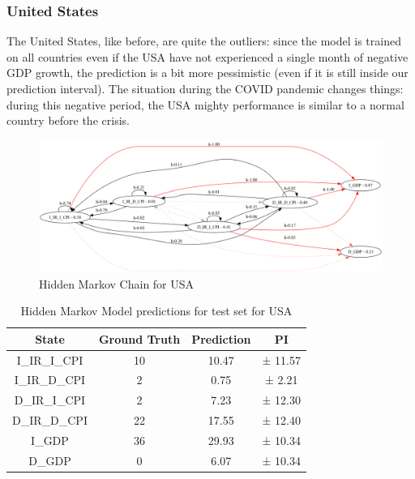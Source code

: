 \subsubsection*{United States}

The United States, like before, are quite the outliers: since the model is trained on all countries even if the USA have not experienced a single month of negative GDP growth, the prediction is a bit more pessimistic (even if it is still inside our prediction interval). The situation during the COVID pandemic changes things: during this negative period, the USA mighty performance is similar to a normal country before the crisis.

\begin{figure}[H]
    \centering
    \includegraphics[width=\linewidth]{imgs/usa_hmm.png}
    \caption{Hidden Markov Chain for USA}
    \label{fig:correlation_us}
\end{figure}

\begin{table}[H]
  \centering
  \begin{tabular}{|c|c|c|c|}
    \hline
    State         & Ground Truth & Prediction & PI      \\
    \hline
    I\_IR\_I\_CPI & 10           & 10.47      & ± 11.57 \\
    I\_IR\_D\_CPI & 2            & 0.75       & ± 2.21  \\
    D\_IR\_I\_CPI & 2            & 7.23       & ± 12.30 \\
    D\_IR\_D\_CPI & 22           & 17.55      & ± 12.40 \\
    I\_GDP        & 36           & 29.93      & ± 10.34 \\
    D\_GDP        & 0            & 6.07       & ± 10.34 \\
    \hline
  \end{tabular}
  \label{tab:usa_test}
  \caption{Hidden Markov Model predictions for test set for USA}
\end{table}


